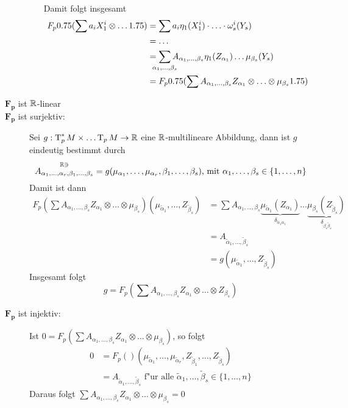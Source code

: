 \begin{Loes}
\begin{description}
\begin{itemize}[leftmargin=*]
\begin{align*}
			\end{align*}
			Damit folgt insgesamt
			\begin{align*}
				F_p\left(\sum a_i X_1^{i} \otimes \ldots \right) &= \sum a_i \eta_1 (X_1^{i}) \cdot \ldots \cdot \omega_s^{i} (Y_s) \\
					& = \ldots \\
					& = \sum_{\mathclap{\alpha_1,\ldots ,\beta_s}} A_{\alpha_1,\ldots ,\beta_s} \eta_1(Z_{\alpha_1}) \ldots \mu_{\beta_s}(Y_s)\\
					& = F_p \left(\sum A_{\alpha_1,\ldots ,\beta_s} Z_{\alpha_1} \otimes \ldots \otimes \mu_{\beta_s}\right)
			\end{align*}
	\end{itemize}
\item[$\bm{F_p}$ ist $\operatorname{\mathbb{R}}$-linear]
\item[$\bm{F_p}$ ist surjektiv:]
	Sei $g: \operatorname{T}_p^*M \times \ldots \operatorname{T}_pM \to \operatorname{\mathbb{R}}$ eine $\operatorname{\mathbb{R}}$-multilineare Abbildung, dann ist $g$ eindeutig bestimmt durch
		\[ \overset{\operatorname{\mathbb{R}} \ni}{A_{\alpha_1, \ldots , \alpha_r, \beta_1, \ldots , \beta_s}} = g(\mu_{\alpha_1}, \ldots , \mu_{\alpha_r}, \beta_1, \ldots , \beta_s) \text{, mit } \alpha_1, \ldots , \beta_s \in \{1,\ldots ,n\} \]
	Damit ist dann
	\begin{align*}
		F_p\left(\sum A_{\alpha_1,\ldots ,\beta_s} Z_{\alpha_1} \otimes \ldots \otimes \mu_{\beta_s}\right) (\mu_{\tilde\alpha_1},\ldots ,Z_{\tilde\beta_s}) &= \sum A_{\alpha_1,\ldots ,\beta_s} \underbrace{\mu_{\tilde \alpha_1}(Z_{\alpha_1})}_{\delta_{\tilde \alpha_1 \alpha_1}} \ldots \underbrace{\mu_{\beta_s} (Z_{\tilde \beta_s})}_{\delta_{\beta_s\tilde\beta_s}}\\
		&= A_{\tilde\alpha_1,\ldots ,\tilde\beta_s}\\
		&= g(\mu_{\tilde\alpha_1},\ldots ,Z_{\tilde\beta_s})
	\end{align*}
	Insgesamt folgt
		\[ g = F_p\left(\sum A_{\alpha_1,\ldots ,\beta_s} Z_{\alpha_1} \otimes \ldots  \otimes Z_{\beta_s}\right) \]
\item[$\bm{F_p}$ ist injektiv:]
	Ist $0 = F_p(\sum A_{\alpha_1,\ldots ,\beta_s} Z_{\alpha_1} \otimes \ldots \otimes \mu_{\beta_s})$, so folgt
	\begin{align*}
		0 &= F_p() (\mu_{\tilde\alpha_1},\ldots ,\mu_{\tilde\alpha_r}, Z_{\tilde\beta_1}, \ldots , Z_{\tilde\beta_s})\\
		&= A_{\tilde\alpha_1,\ldots ,\tilde\beta_s} \text{ f"ur alle } \tilde\alpha_1, \ldots , \tilde\beta_s \in \{1,\ldots ,n\}
	\end{align*}
	Daraus folgt $\sum A_{\alpha_1,\ldots ,\beta_s} Z_{\alpha_1} \otimes \ldots \otimes \mu_{\beta_s} = 0$

\end{description}
\end{Loes}
